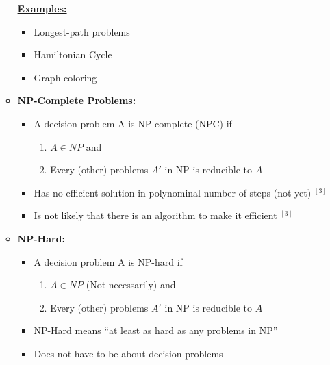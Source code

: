 \documentclass[12pt]{article}
\begin{document}
\begin{enumerate}[1.]
\begin{itemize}
        \bigskip

        \underline{\textbf{Examples:}}

        \begin{itemize}
            \item Longest-path problems
            \item Hamiltonian Cycle
            \item Graph coloring
        \end{itemize}

        \bigskip

        \item \textbf{NP-Complete Problems:}


        \begin{itemize}
            \item A decision problem A is NP-complete (NPC) if

            \begin{enumerate}[1)]
                \item $A \in NP$ and
                \item Every (other) problems $A'$ in NP is reducible to $A$
            \end{enumerate}
            \item Has no efficient solution in polynominal number of steps (not yet) $^{[3]}$
            \item Is not likely that there is an algorithm to make it efficient $^{[3]}$
        \end{itemize}

        \item \textbf{NP-Hard:}

        \bigskip

        \begin{itemize}
            \item A decision problem A is NP-hard if

            \begin{enumerate}[1)]
                \item $A \in NP$ (Not necessarily) and
                \item Every (other) problems $A'$ in NP is reducible to $A$
            \end{enumerate}
            \item NP-Hard means ``at least as hard as any problems in NP''
            \item Does not have to be about decision problems
        \end{itemize}


\end{itemize}
\end{enumerate}
\end{document}
